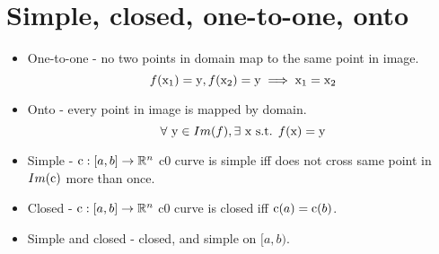 \section*{Simple, closed, one-to-one, onto}
\begin{itemize}
    \item One-to-one - no two points in domain map to the same point in image.
    $$f(\textrm{x}_1)=\textrm{y}, f(\textrm{x}_2)=\textrm{y} \implies \textrm{x}_1 = \textrm{x}_2$$
    \item Onto - every point in image is mapped by domain.
    $$\forall~ \textrm{y} \in Im(f), \exists~\textrm{x} \textrm{ s.t. } f(\textrm{x})=\textrm{y}$$
    \item Simple - $\textrm{c}:[a,b]\to\mathbb{R}^n$ c0 curve is simple iff does not cross same point in $Im(\textrm{c})$ more than once.
    \item Closed - $\textrm{c}:[a,b]\to\mathbb{R}^n$ c0 curve is closed iff $\textrm{c}(a) = \textrm{c}(b)$.
    \item Simple and closed - closed, and simple on $[a,b)$.
\end{itemize}{}

\begin{comment}
\section*{Surface area}
Let $T_u, T_v$ be tangents. Surface area is the sum of parallelogram areas.
$$SA(S) = \iint_{D}||T_u\times T_v||dudv$$
\subsection*{Surface area reparameterization}
$$\iint_S f(\x)dS = \iint_D f(\Phi(u,v))||T_u\times T_v|| du dv$$
If 0, then this means that net integral is 0.
\subsubsection{Surface orientation}
If it exists, a surface orientation of $S\in \mathbb{R}^n$ is a choice of unit normal vector at each point of the surface so that the vectors vary continuously. At any point, although there are many options for normal vectors, there are only options for unit vectors (inside versus outside, or above versus below). E.g. a mobius strip doesn't have an orientation.

\section*{Flux (vector surface integral)}
Measures vector field flow across surface.
For $F:\mathbb{R}^3\to\mathbb{R}^3$, $S=\Phi(D)$ where $\Phi:D\to\mathbb{R}^3$ a surface with a parameterization.
$$\iint_{S}F\cdot dS=\iint_{D}F(\Phi(u,v))\cdot (T_u\times T_v)dudv$$
\end{comment}